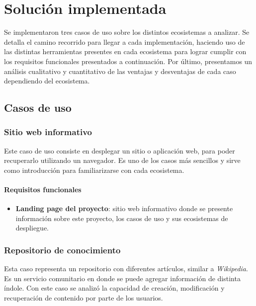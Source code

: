 \section{Solución implementada}

Se implementaron tres casos de uso sobre los distintos ecosistemas a analizar. Se detalla el camino recorrido para llegar a cada implementación, haciendo uso de las distintas herramientas presentes en cada ecosistema para lograr cumplir con los requisitos funcionales presentados a continuación. Por último, presentamos un análisis cualitativo y cuantitativo de las ventajas y desventajas de cada caso dependiendo del ecosistema.

\subsection{Casos de uso}

\subsubsection{Sitio web informativo}

Este caso de uso consiste en desplegar un sitio o aplicación web, para poder recuperarlo utilizando un navegador. Es uno de los casos más sencillos y sirve como introducción para familiarizarse con cada ecosistema.

\paragraph{Requisitos funcionales}

\begin{itemize}
    \item \textbf{Landing page del proyecto}: sitio web informativo donde se presente información sobre este proyecto, los casos de uso y sus ecosistemas de despliegue.
\end{itemize}

\subsubsection{Repositorio de conocimiento}

Esta caso representa un repositorio con diferentes artículos, similar a \textit{Wikipedia}. Es un servicio comunitario en donde se puede agregar información de distinta índole. Con este caso se analizó la capacidad de creación, modificación y recuperación de contenido por parte de los usuarios.

